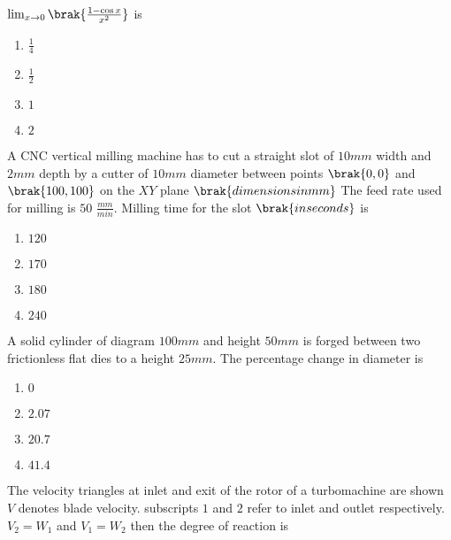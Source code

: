 \iffalse
    \author{EE24BTECH11029}
    \section{me}
    \chapter{2012}
\fi

\item $\lim_{x\to 0}\brak{\frac{1-\cos{x}}{x^2}}$ is
    \begin{enumerate}
        \item $\frac{1}{4}$
        \item $\frac{1}{2}$
        \item $1$
        \item $2$
    \end{enumerate}
    \item A CNC vertical milling machine has to cut a straight slot of $10 mm$ width and $2 mm$ depth by a cutter of $10 mm$ diameter between points $\brak{0, 0}$ and $\brak{100, 100}$ on the $XY$ plane $\brak{dimensions in mm}$ The feed rate used for milling is $50$ $\frac{mm}{min}.$ Milling time for the slot $\brak{in seconds}$ is
    \begin{enumerate}
        \item $120$
        \item $170$
        \item $180$
        \item $240$
    \end{enumerate}
    \item A solid cylinder of diagram $100 mm$ and height $50 mm$ is forged between two frictionless flat dies to a height $25mm$. The percentage change in diameter is
    \begin{enumerate}
        \item $0$
        \item $2.07$
        \item $20.7$
        \item $41.4$
    \end{enumerate}
    \item The velocity triangles at inlet and exit of the rotor of a turbomachine are shown $V$ denotes blade velocity. subscripts $1$ and $2$ refer to inlet and outlet respectively.$V_2=W_1$ and $V_1=W_2$ then the degree of reaction is



